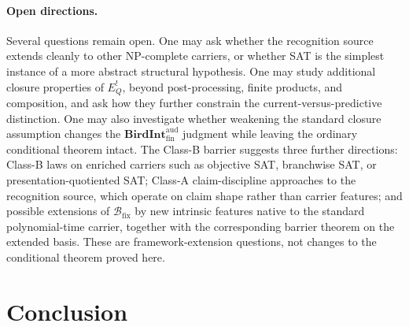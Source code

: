 \documentclass[11pt]{article}
\newcommand{\EQbang}{E^{!}_{Q}}
\newcommand{\BirdInt}{\mathbf{BirdInt}^{\mathrm{aud}}_{\mathrm{fin}}}
\theoremstyle{definition}
\begin{document}
\paragraph{Open directions.}
Several questions remain open.  One may ask whether the
recognition source extends cleanly to other NP-complete carriers, or
whether SAT is the simplest instance of a more abstract structural
hypothesis.  One may study additional closure properties of
\(\EQbang\), beyond post-processing, finite products, and composition,
and ask how they further constrain the current-versus-predictive
distinction.  One may also investigate whether weakening the standard
closure assumption changes the \(\BirdInt\) judgment while leaving the
ordinary conditional theorem intact.  The Class-B barrier suggests
three further directions: Class-B laws on enriched carriers such as
objective SAT, branchwise SAT, or presentation-quotiented SAT;
Class-A claim-discipline approaches to the recognition source, which
operate on claim shape rather than carrier features; and possible
extensions of \(\mathcal B_{\mathrm{fix}}\) by new intrinsic features
native to the standard polynomial-time carrier, together with the
corresponding barrier theorem on the extended basis.  These are
framework-extension questions, not changes to the conditional theorem
proved here.
 

\section{Conclusion}
\label{sec:conclusion}
\end{document}
